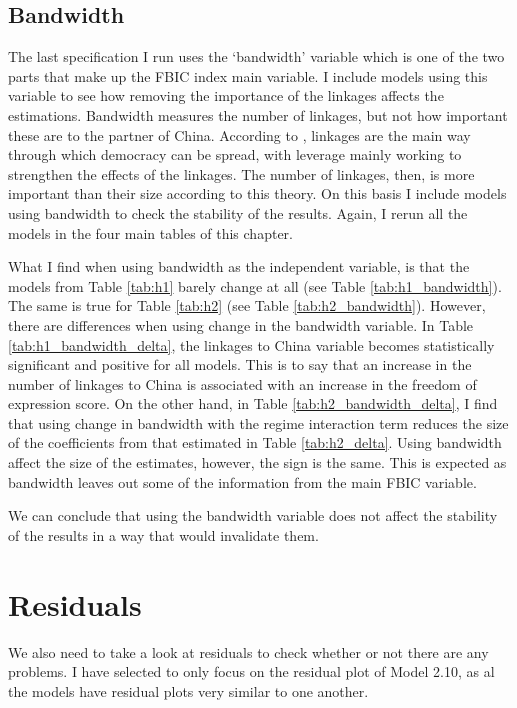 \subsection{Bandwidth}
The last specification I run uses the `bandwidth' variable which is one of the two parts that make up the FBIC index main variable. I include models using this variable to see how removing the importance of the linkages affects the estimations. Bandwidth measures the number of linkages, but not how important these are to the partner of China. According to \citet{levitsky_linkage_2006}, linkages are the main way through which democracy can be spread, with leverage mainly working to strengthen the effects of the linkages. The number of linkages, then, is more important than their size according to this theory. On this basis I include models using bandwidth to check the stability of the results. Again, I rerun all the models in the four main tables of this chapter.

What I find when using bandwidth as the independent variable, is that the models from Table \ref{tab:h1} barely change at all (see Table \ref{tab:h1_bandwidth}). The same is true for Table \ref{tab:h2} (see Table \ref{tab:h2_bandwidth}). However, there are differences when using change in the bandwidth variable. In Table \ref{tab:h1_bandwidth_delta}, the linkages to China variable becomes statistically significant and positive for all models. This is to say that an increase in the number of linkages to China is associated with an increase in the freedom of expression score. On the other hand, in Table \ref{tab:h2_bandwidth_delta}, I find that using change in bandwidth with the regime interaction term reduces the size of the coefficients from that estimated in Table \ref{tab:h2_delta}. Using bandwidth affect the size of the estimates, however, the sign is the same. This is expected as bandwidth leaves out some of the information from the main FBIC variable. 

We can conclude that using the bandwidth variable does not affect the stability of the results in a way that would invalidate them. 

\section{Residuals}
We also need to take a look at residuals to check whether or not there are any problems. I have selected to only focus on the residual plot of Model 2.10, as al the models have residual plots very similar to one another.

